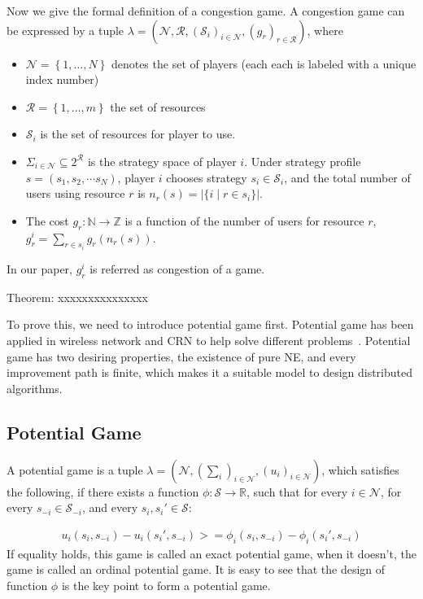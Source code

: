 Now we give the formal definition of a congestion game.
A congestion game \cite{Rosenthal}\cite{Voecking06congestiongames} can be expressed by a tuple $\lambda=(\mathcal{N},\mathcal{R},(\mathcal{S}_i)_{i \in \mathcal{N}},(g_r)_{r\in \mathcal{R}})$, where
\begin{itemize}
\item $\mathcal{N}=\left\{1,\ldots,N\right\}$ denotes the set of players (each each is labeled with a unique index number)
\item $\mathcal{R}=\left\{1,\ldots,m\right\}$ the set of resources
\item $\mathcal{S}_i$ is the set of resources for player to use.
\item $\Sigma_{i\in\mathcal{N}} \subseteq 2^{\mathcal{R}}$ is the strategy space of player $i$. 
Under strategy profile $s=(s_1,s_2,\cdots s_N)$, player $i$ chooses strategy $s_i\in \mathcal{S}_i$, and the total number of users using resource $r$ is $n_r(s)=|\{i\mid r\in s_i\}|$. 
\item The cost $g_r: \mathbb{N}\rightarrow \mathbb{Z}$ is a function of the number of users for resource $r$, $g_r^i=\sum_{r\in s_i} g_r(n_r(s))$. 
\end{itemize}
In our paper, $g_r^i$ is referred as congestion of a game.

Theorem:
xxxxxxxxxxxxxxx

To prove this, we need to introduce potential game first.
Potential game has been applied in wireless network and CRN to help solve different problems~\cite{CApotentialLearning_05dyspan, caps_potential2012, self-coexistenceWRAN2010infocom, pimrc_2012}.
Potential game has two desiring properties, the existence of pure NE, and every improvement path is finite, which makes it a suitable model to design distributed algorithms.


\subsection{Potential Game}

A potential game is a tuple $\lambda=(\mathcal{N},(\sum_i)_{i \in \mathcal{N}},(u_i)_{i\in \mathcal{N}})$, which satisfies the following, if there exists a function $\phi: \mathcal{S}\rightarrow \mathbb{R}$, such that for every $i\in \mathcal{N}$, for every $s_{-i}\in \mathcal{S}_{-i}$, and every $s_i, s_i'\in \mathcal{S}$:

\begin{equation}
\label{2:1}
\begin{split}
u_i(s_i, s_{-i})-u_i(s_i', s_{-i}) >= \phi_i(s_i, s_{-i})-\phi_i(s_i', s_{-i})
\end{split}
\end{equation}
If equality holds, this game is called an exact potential game, when it doesn't, the game is called an ordinal potential game.
It is easy to see that the design of function $\phi$ is the key point to form a potential game.

